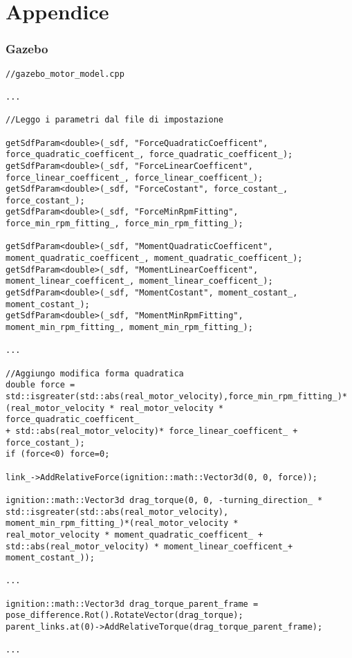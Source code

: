 \chapter{Appendice}
\subsection{Gazebo}

\lstset{language=c++}
\begin{lstlisting}
//gazebo_motor_model.cpp

...

//Leggo i parametri dal file di impostazione

getSdfParam<double>(_sdf, "ForceQuadraticCoefficent", force_quadratic_coefficent_, force_quadratic_coefficent_);
getSdfParam<double>(_sdf, "ForceLinearCoefficent", force_linear_coefficent_, force_linear_coefficent_);
getSdfParam<double>(_sdf, "ForceCostant", force_costant_, force_costant_);
getSdfParam<double>(_sdf, "ForceMinRpmFitting", force_min_rpm_fitting_, force_min_rpm_fitting_);

getSdfParam<double>(_sdf, "MomentQuadraticCoefficent", moment_quadratic_coefficent_, moment_quadratic_coefficent_);
getSdfParam<double>(_sdf, "MomentLinearCoefficent", moment_linear_coefficent_, moment_linear_coefficent_);
getSdfParam<double>(_sdf, "MomentCostant", moment_costant_, moment_costant_);
getSdfParam<double>(_sdf, "MomentMinRpmFitting", moment_min_rpm_fitting_, moment_min_rpm_fitting_);

...

//Aggiungo modifica forma quadratica
double force = std::isgreater(std::abs(real_motor_velocity),force_min_rpm_fitting_)*
(real_motor_velocity * real_motor_velocity * force_quadratic_coefficent_ 
+ std::abs(real_motor_velocity)* force_linear_coefficent_ + force_costant_);
if (force<0) force=0;

link_->AddRelativeForce(ignition::math::Vector3d(0, 0, force));

ignition::math::Vector3d drag_torque(0, 0, -turning_direction_ *
std::isgreater(std::abs(real_motor_velocity),
moment_min_rpm_fitting_)*(real_motor_velocity * 
real_motor_velocity * moment_quadratic_coefficent_ + 
std::abs(real_motor_velocity) * moment_linear_coefficent_+ moment_costant_));

...

ignition::math::Vector3d drag_torque_parent_frame = pose_difference.Rot().RotateVector(drag_torque);
parent_links.at(0)->AddRelativeTorque(drag_torque_parent_frame);

...

\end{lstlisting}

